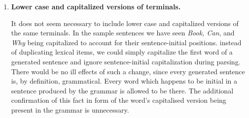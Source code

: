\documentclass{article}
\begin{document}
\begin{enumerate}
		\item
		\textbf{Lower case and capitalized versions of terminals.}
		
		It does not seem necessary to include lower case and capitalized versions of the same terminals. In the sample sentences we have seen \textit{Book, Can}, and \textit{Why} being capitalized to account for their sentence-initial positions. instead of duplicating lexical items, we could simply capitalize  the first word of a generated sentence and ignore sentence-initial capitalization during parsing.
		There would be no ill effects of such a change, since every generated sentence is, by definition, grammatical. Every word which happens to be initial in a sentence produced by the grammar is allowed to be there. The additional confirmation of this fact in form of the word's capitalised version being present in the grammar is unnecessary.
	\end{enumerate}
\end{document}
